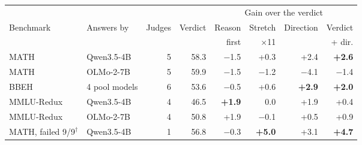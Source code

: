 \begin{tabular}{llr r rrrr}
\toprule
& & & & \multicolumn{4}{c}{Gain over the verdict} \\ \cmidrule(l){5-8}
Benchmark & Answers by & Judges & Verdict & Reason & Stretch & Direction & Verdict \\
& & & & first & $\times$11 & & + dir. \\
\midrule
MATH & Qwen3.5-4B & 5 & 58.3 & $-$1.5 & +0.3 & +2.4 & \textbf{+2.6} \\
MATH & OLMo-2-7B & 5 & 59.9 & $-$1.5 & $-$1.2 & $-$4.1 & $-$1.4 \\
BBEH & 4 pool models & 6 & 53.6 & $-$0.5 & +0.6 & \textbf{+2.9} & \textbf{+2.0} \\
MMLU-Redux & Qwen3.5-4B & 4 & 46.5 & \textbf{+1.9} & 0.0 & +1.9 & +0.4 \\
MMLU-Redux & OLMo-2-7B & 4 & 50.8 & +1.9 & $-$0.1 & +0.5 & +0.9 \\
\midrule
MATH, failed 9/9$^\dagger$ & Qwen3.5-4B & 1 & 56.8 & $-$0.3 & \textbf{+5.0} & +3.1 & \textbf{+4.7} \\
\bottomrule
\end{tabular}
